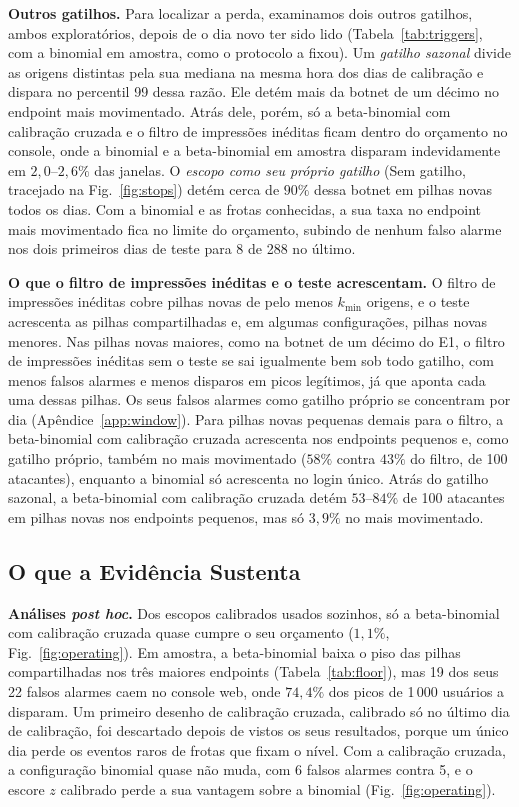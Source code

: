 \documentclass[conference,letterpaper,10pt]{IEEEtran}
\newcommand\1{\textit{(i)}}
\newcommand\2{\textit{(ii)}}
\newcommand\3{\textit{(iii)}}
\begin{document}
\textbf{Outros gatilhos.} Para localizar a perda, examinamos dois outros gatilhos, ambos exploratórios, depois de o dia novo ter sido lido (Tabela~\ref{tab:triggers}, com a binomial em amostra, como o protocolo a fixou). Um \textit{gatilho sazonal} divide as origens distintas pela sua mediana na mesma hora dos dias de calibração e dispara no percentil 99 dessa razão. Ele detém mais da botnet de um décimo no endpoint mais movimentado. Atrás dele, porém, só a beta-binomial com calibração cruzada e o filtro de impressões inéditas ficam dentro do orçamento no console, onde a binomial e a beta-binomial em amostra disparam indevidamente em $2{,}0$--$2{,}6\%$ das janelas. O \textit{escopo como seu próprio gatilho} (Sem gatilho, tracejado na Fig.~\ref{fig:stops}) detém cerca de $90\%$ dessa botnet em pilhas novas todos os dias. Com a binomial e as frotas conhecidas, a sua taxa no endpoint mais movimentado fica no limite do orçamento, subindo de nenhum falso alarme nos dois primeiros dias de teste para 8 de 288 no último.

\textbf{O que o filtro de impressões inéditas e o teste acrescentam.} O filtro de impressões inéditas cobre pilhas novas de pelo menos $k_{\min}$ origens, e o teste acrescenta as pilhas compartilhadas e, em algumas configurações, pilhas novas menores. Nas pilhas novas maiores, como na botnet de um décimo do E1, o filtro de impressões inéditas sem o teste se sai igualmente bem sob todo gatilho, com menos falsos alarmes e menos disparos em picos legítimos, já que aponta cada uma dessas pilhas. Os seus falsos alarmes como gatilho próprio se concentram por dia (Apêndice~\ref{app:window}). Para pilhas novas pequenas demais para o filtro, a beta-binomial com calibração cruzada acrescenta nos endpoints pequenos e, como gatilho próprio, também no mais movimentado ($58\%$ contra $43\%$ do filtro, de 100 atacantes), enquanto a binomial só acrescenta no login único. Atrás do gatilho sazonal, a beta-binomial com calibração cruzada detém $53$--$84\%$ de 100 atacantes em pilhas novas nos endpoints pequenos, mas só $3{,}9\%$ no mais movimentado.

\subsection{O que a Evidência Sustenta}
\label{sec:posthoc}
\label{sec:boundary}

\textbf{Análises \textit{post hoc}.} Dos escopos calibrados usados sozinhos, só a beta-binomial com calibração cruzada quase cumpre o seu orçamento ($1{,}1\%$, Fig.~\ref{fig:operating}). Em amostra, a beta-binomial baixa o piso das pilhas compartilhadas nos três maiores endpoints (Tabela~\ref{tab:floor}), mas 19 dos seus 22 falsos alarmes caem no console web, onde $74{,}4\%$ dos picos de 1\,000 usuários a disparam. Um primeiro desenho de calibração cruzada, calibrado só no último dia de calibração, foi descartado depois de vistos os seus resultados, porque um único dia perde os eventos raros de frotas que fixam o nível. Com a calibração cruzada, a configuração binomial quase não muda, com 6 falsos alarmes contra 5, e o escore $z$ calibrado perde a sua vantagem sobre a binomial (Fig.~\ref{fig:operating}).
\end{document}
